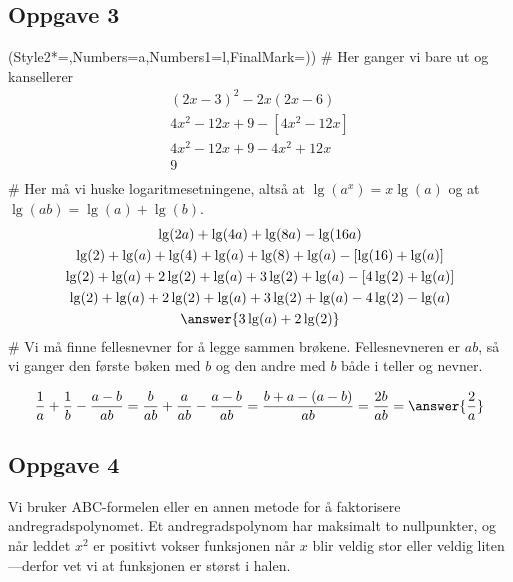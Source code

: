 \subsection*{Oppgave 3}
\begin{easylist}[enumerate]
	\ListProperties(Style2*=,Numbers=a,Numbers1=l,FinalMark={)})
	# Her ganger vi bare ut og kansellerer
	\begin{gather*}
		\left( 2x - 3\right)^2 - 2x \left(2x - 6\right) \\
		4x^2 - 12x + 9 - \left[ 4x^2 - 12x\right] \\
		4x^2 - 12x + 9 -  4x^2 + 12x \\
	9 \\
	\end{gather*}
	# Her må vi huske logaritmesetningene, altså at $\lg (a^x) = x \lg (a)$ og at $\lg \left(a b\right) = \lg (a) + \lg (b)$.
	\begin{gather*}
		\lg (2a) + \lg (4a) + \lg (8a) - \lg (16a) \\
		\lg (2) + \lg (a) + \lg (4) + \lg (a) + \lg (8) +\lg (a) - \left[\lg (16) + \lg (a)\right] \\ 
		\lg (2) + \lg (a) + 2\lg (2) + \lg (a) + 3\lg (2) +\lg (a) - \left[4 \lg (2) + \lg (a)\right] \\
		\lg (2) + \lg (a) + 2\lg (2) + \lg (a) + 3\lg (2) +\lg (a) - 4 \lg (2) - \lg (a) \\
		\answer{3 \lg (a) + 2 \lg (2)}
	\end{gather*}
	# Vi må finne fellesnevner for å legge sammen brøkene. Fellesnevneren er $ab$, så vi ganger den første bøken med $b$ og den andre med $b$ både i teller og nevner.
	
	\begin{equation*}
		\frac{1}{a} + \frac{1}{b} - \frac{a - b}{ab} =
		\frac{b}{ab} + \frac{a}{ab} - \frac{a - b}{ab} =
		\frac{b + a - (a - b)}{ab} =
		\frac{2b}{ab} = \answer{\frac{2}{a}} 
	\end{equation*}
\end{easylist}

\subsection*{Oppgave 4}
Vi bruker ABC-formelen eller en annen metode for å faktorisere andregradspolynomet. Et andregradspolynom har maksimalt to nullpunkter, og når leddet $x^2$ er positivt vokser funksjonen når $x$ blir veldig stor eller veldig liten---derfor vet vi at funksjonen er størst i halen.

